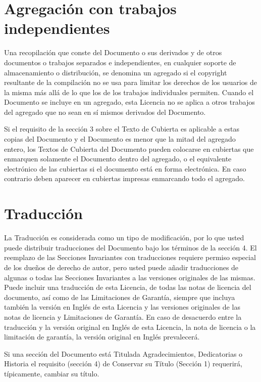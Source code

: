 \section{Agregación con trabajos independientes}

Una recopilación que conste del Documento o sus derivados y de otros
documentos o trabajos separados e independientes, en cualquier soporte
de almacenamiento o distribución, se denomina un agregado si el copyright
resultante de la compilación no se usa para limitar los derechos de
los usuarios de la misma más allá de lo que los de los trabajos individuales
permiten. Cuando el Documento se incluye en un agregado, esta Licencia
no se aplica a otros trabajos del agregado que no sean en sí mismos
derivados del Documento.

Si el requisito de la sección 3 sobre el Texto de Cubierta es aplicable
a estas copias del Documento y el Documento es menor que la mitad
del agregado entero, los Textos de Cubierta del Documento pueden colocarse
en cubiertas que enmarquen solamente el Documento dentro del agregado,
o el equivalente electrónico de las cubiertas si el documento está
en forma electrónica. En caso contrario deben aparecer en cubiertas
impresas enmarcando todo el agregado.

\section{Traducción}

La Traducción es considerada como un tipo de modificación, por lo
que usted puede distribuir traducciones del Documento bajo los términos
de la sección 4. El reemplazo de las Secciones Invariantes con traducciones
requiere permiso especial de los dueños de derecho de autor, pero
usted puede añadir traducciones de algunas o todas las Secciones Invariantes
a las versiones originales de las mismas. Puede incluir una traducción
de esta Licencia, de todas las notas de licencia del documento, así
como de las Limitaciones de Garantía, siempre que incluya también
la versión en Inglés de esta Licencia y las versiones originales de
las notas de licencia y Limitaciones de Garantía. En caso de desacuerdo
entre la traducción y la versión original en Inglés de esta Licencia,
la nota de licencia o la limitación de garantía, la versión original
en Inglés prevalecerá.

Si una sección del Documento está Titulada Agradecimientos, Dedicatorias
o Historia el requisito (sección 4) de Conservar su Título (Sección
1) requerirá, típicamente, cambiar su título.

